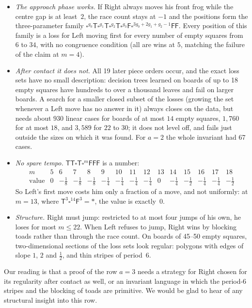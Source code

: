 \documentclass[11pt,a4paper]{article}
\newcommand{\Tt}{\mathsf{T}}
\newcommand{\Ff}{\mathsf{F}}
\newcommand{\E}{\square}
\theoremstyle{plain}
\theoremstyle{remark}
\begin{document}
\begin{itemize}
\item \emph{The approach phase works.} If Right always moves his front frog while the centre gap
  is at least~$2$, the race count stays at $-1$ and the positions form the three-parameter family
  $\E^{g_0}\Tt\E^{g_1}\Tt\E^{g_2}\Tt\E^{g_3}\Ff\E^{3g_0+2g_1+g_2-1}\Ff\Ff$. Every position of this
  family is a loss for Left moving first for every number of empty squares from $6$ to $34$,
  with no congruence condition (all are wins at $5$, matching the failure of the claim at $m=4$).
\item \emph{After contact it does not.} All 19 later piece orders occur, and the exact loss sets
  have no small description: decision trees learned on boards of up to 18 empty squares have
  hundreds to over a thousand leaves and fail on larger boards. A search for a smaller closed
  subset of the losses (growing the set whenever a Left move has no answer in it) always closes
  on the data, but needs about $930$ linear cases for boards of at most $14$ empty squares,
  $1{,}760$ for at most $18$, and $3{,}589$ for $22$ to $30$; it does not level off, and fails just
  outside the sizes on which it was found. For $a=2$ the whole invariant had 67 cases.
\item \emph{No spare tempo.} $\Tt\Tt\E\Tt\E^m\Ff\Ff\Ff$ is a number:
  \[
  \begin{array}{c|cccccccccccccc}
  m & 5 & 6 & 7 & 8 & 9 & 10 & 11 & 12 & 13 & 14 & 15 & 16 & 17 & 18\\\hline
  \text{value} & 0 & -\frac18 & -\frac18 & -\frac18 & -\frac14 & -\frac14 & -\frac14 & -\frac14
    & 0 & -\frac14 & -\frac12 & -\frac14 & -\frac14 & -\frac12
  \end{array}
  \]
  So Left's first move costs him only a fraction of a move, and not uniformly: at $m=13$, where
  $\Tt^3\E^{14}\Ff^3=\ast$, the value is exactly~$0$.
\item \emph{Structure.} Right must jump: restricted to at most four jumps of his own, he
  loses for most $m\le22$. When Left refuses to jump, Right wins by blocking toads rather than
  through the race count. On boards of 45--50 empty squares, two-dimensional
  sections of the loss sets look regular: polygons with edges of slope $1$, $2$ and $\frac12$, and
  thin stripes of period~$6$.
\end{itemize}

\noindent
Our reading is that a proof of the row $a=3$ needs a strategy for Right chosen for its regularity
after contact as well, or an invariant language in which the period-6 stripes and the blocking of
toads are primitive. We would be glad to hear of any structural insight into this row.
\end{document}
